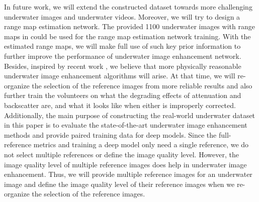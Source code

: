 \documentclass[journal]{IEEEtran}
\begin{document}
In future work, we will extend the constructed dataset towards more challenging underwater images and underwater videos. Moreover, we will try to design a range map estimation network. The provided 1100 underwater images with range maps in \cite{Akkaynak2019} could be used for the range map estimation network training. With the estimated range maps, we will make full use of such key prior information to further improve the performance of underwater image enhancement network. Besides, inspired by recent work \cite{Akkaynak2017,Akkaynak2019}, we believe that more physically reasonable underwater image enhancement algorithms will arise. At that time, we will re-organize the selection of the reference images from more reliable results and also further train the volunteers on what the degrading effects of attenuation and backscatter are, and what it looks like when either is improperly corrected.
Additionally, the main purpose of constructing the real-world underwater dataset in this paper is to evaluate the state-of-the-art underwater image enhancement methods and provide paired training data for deep models. Since the full-reference metrics and training a deep model only need a single reference, we do not select multiple references or define the image quality level. However, the image quality level of multiple reference images does help in underwater image enhancement. Thus, we will provide multiple reference images for an underwater image and define the image quality level of their reference images when we re-organize the selection of the reference images.







\end{document}
